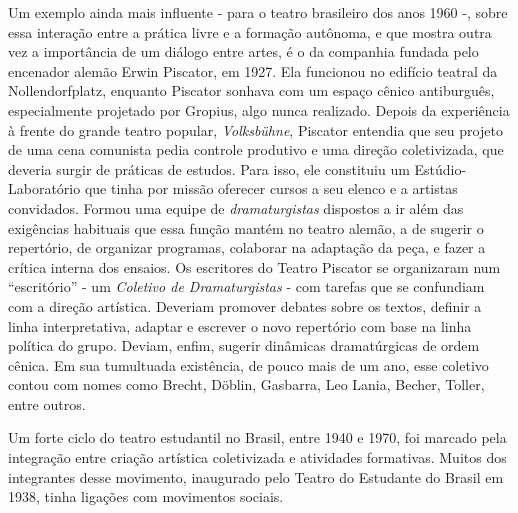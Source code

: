 Um exemplo ainda mais influente - para o teatro brasileiro dos anos 1960
-, sobre essa interação entre a prática livre e a formação autônoma, e
que mostra outra vez a importância de um diálogo entre artes, é o da
companhia fundada pelo encenador alemão Erwin Piscator, em 1927. Ela
funcionou no edifício teatral da Nollendorfplatz, enquanto Piscator
sonhava com um espaço cênico antiburguês, especialmente projetado por
Gropius, algo nunca realizado. Depois da experiência à frente do grande
teatro popular, \textit{Volksbühne}, Piscator entendia que seu projeto de
uma cena comunista pedia controle produtivo e uma direção coletivizada,
que deveria surgir de práticas de estudos. Para isso, ele constituiu um
Estúdio-Laboratório que tinha por missão oferecer cursos a seu elenco e
a artistas convidados. Formou uma equipe de \textit{dramaturgistas}
dispostos a ir além das exigências habituais que essa função mantém no
teatro alemão, a de sugerir o repertório, de organizar programas,
colaborar na adaptação da peça, e fazer a crítica interna dos ensaios.
Os escritores do Teatro Piscator se organizaram num “escritório” - um
\textit{Coletivo de Dramaturgistas} - com tarefas que se confundiam com a
direção artística. Deveriam promover debates sobre os textos, definir a
linha interpretativa, adaptar e escrever o novo repertório com base na
linha política do grupo. Deviam, enfim, sugerir dinâmicas dramatúrgicas
de ordem cênica. Em sua tumultuada existência, de pouco mais de um ano,
esse coletivo contou com nomes como Brecht, Döblin, Gasbarra, Leo Lania,
Becher, Toller, entre outros.

Um forte ciclo do teatro estudantil no Brasil, entre 1940 e 1970, foi
marcado pela integração entre criação artística coletivizada e
atividades formativas. Muitos dos integrantes desse movimento,
inaugurado pelo Teatro do Estudante do Brasil em 1938, tinha ligações
com movimentos sociais.

